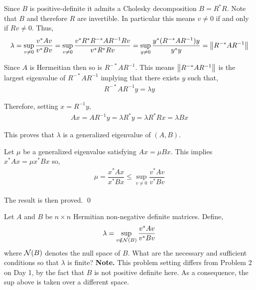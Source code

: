 \documentclass[10pt]{article}
\begin{document}
\begin{solution}
Since \( B \) is positive-definite it admits a Cholesky decomposition \( B = R^*R \). Note that \( B \) and therefore \( R \) are invertible. In particular this means \( v\neq 0 \) if and only if \( Rv\neq 0 \).
Thus,
\begin{align*}
    \lambda
    = \sup_{v\neq 0} \dfrac{v^*Av}{v^*Bv}
    = \sup_{v\neq 0} \dfrac{v^*R^*R^{-*}AR^{-1}Rv}{v^*R^*Rv}
    = \sup_{y\neq 0} \dfrac{y^* (R^{-*}AR^{-1}) y}{y^*y}
    = \left\lVert R^{-*}AR^{-1}\right\rVert
\end{align*}

Since \( A \) is Hermeitian then so is \( R^{-*}AR^{-1} \). This means \( \left\lVert R^{-*}AR^{-1}\right\rVert \) is the largest eigenvalue of \( R^{-*}AR^{-1} \) implying that there exists \( y \) such that,
\begin{align*}
    R^{-*}AR^{-1} y = \lambda y
\end{align*}

Therefore, setting \( x = R^{-1}y \),
\begin{align*}
    Ax = AR^{-1}y = \lambda R^*y = \lambda R^*Rx = \lambda Bx
\end{align*}

This proves that \( \lambda \) is a generalized eigenvalue of \( (A,B) \).

Let \( \mu \) be a generalized eigenvalue satisfying \( Ax = \mu Bx \). This implies \( x^*Ax = \mu x^*Bx  \) so,
\begin{align*}
     \mu = \dfrac{x^*Ax}{x^*Bx} \leq \sup_{v\neq 0} \dfrac{v^*Av}{v^*Bv}
\end{align*}

The result is then proved. \qed
\end{solution}

\begin{problem}
Let \( A \) and \( B \) be \( n\times n \) Hermitian non-negative definite matrices. Define,
\begin{align*}
    \lambda = \sup_{v\notin \mathcal{N}(B)} \dfrac{v^*Av}{v^*Bv}
\end{align*}
where \( \mathcal{N} (B) \) denotes the null space of \( B \). What are the necessary and sufficient conditions so that \( \lambda \) is finite?
\textbf{Note.} This problem setting differs from Problem 2 on Day 1, by the fact that \( B \) is not positive definite here. As a consequence, the sup above is taken over a different space.
\end{problem}
\end{document}
